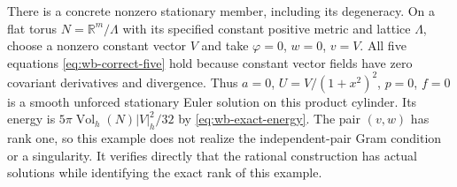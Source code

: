 There is a concrete nonzero stationary member, including its
degeneracy. On a flat torus $N=\mathbb R^m/\Lambda$ with its
specified constant positive metric and lattice $\Lambda$, choose
a nonzero constant vector $V$ and take
$\varphi=0$, $w=0$, $v=V$.
All five equations \eqref{eq:wb-correct-five} hold because constant
vector fields have zero covariant derivatives and divergence.
Thus $a=0$, $U=V/(1+x^2)^2$, $p=0$, $f=0$ is a smooth unforced
stationary Euler solution on this product cylinder. Its energy is
$5\pi\operatorname{Vol}_h(N)|V|_h^2/32$ by
\eqref{eq:wb-exact-energy}. The pair $(v,w)$ has rank one, so this
example does not realize the independent-pair Gram condition or a
singularity. It verifies directly that the rational construction has
actual solutions while identifying the exact rank of this example.
